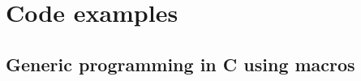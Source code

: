 \section{Code examples}

\subsection{Generic programming in C using macros}
\label{sec:generic-c}


